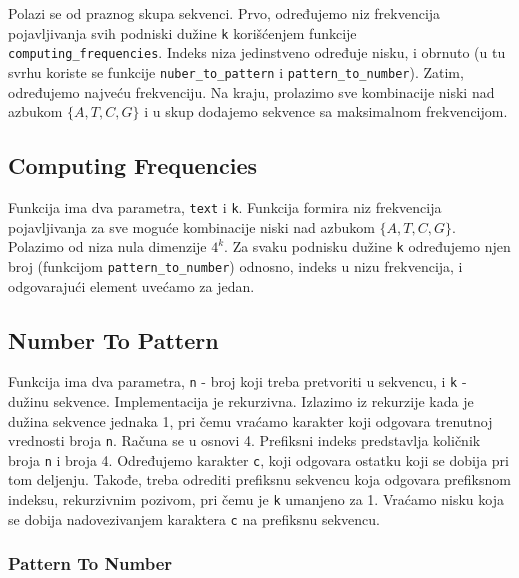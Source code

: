 Polazi se od praznog skupa sekvenci. Prvo, određujemo niz frekvencija pojavljivanja svih podniski dužine \texttt{k} korišćenjem funkcije \texttt{computing\_frequencies}. Indeks niza jedinstveno određuje nisku, i obrnuto (u tu svrhu koriste se funkcije \texttt{nuber\_to\_pattern} i \texttt{pattern\_to\_number}). Zatim, određujemo najveću frekvenciju. Na kraju, prolazimo sve kombinacije niski nad azbukom $\{A, T, C, G\}$ i u skup dodajemo sekvence sa maksimalnom frekvencijom.

 


\subsection{Computing Frequencies}

Funkcija ima dva parametra, \texttt{text} i \texttt{k}. Funkcija formira niz frekvencija pojavljivanja za sve moguće kombinacije niski nad azbukom $\{A, T, C, G\}$.
Polazimo od niza nula dimenzije $4^k$. Za svaku podnisku dužine \texttt{k} određujemo njen broj (funkcijom \texttt{pattern\_to\_number}) odnosno, indeks u nizu frekvencija, i odgovarajući element uvećamo za jedan.

 


\subsection{Number To Pattern}
\label{numberToPattern}

Funkcija ima dva parametra, \texttt{n} - broj koji treba pretvoriti u sekvencu, i \texttt{k} - dužinu sekvence. Implementacija je rekurzivna. Izlazimo iz rekurzije kada je dužina sekvence jednaka 1, pri čemu vraćamo karakter koji odgovara trenutnoj vrednosti broja \texttt{n}. Računa se u osnovi 4. Prefiksni indeks predstavlja količnik broja \texttt{n} i broja 4. Određujemo karakter \texttt{c}, koji odgovara ostatku koji se dobija pri tom deljenju. Takođe, treba odrediti prefiksnu sekvencu koja odgovara prefiksnom indeksu, rekurzivnim pozivom, pri čemu je \texttt{k} umanjeno za 1. Vraćamo nisku koja se dobija nadovezivanjem karaktera \texttt{c} na prefiksnu sekvencu.


 

\subsubsection{Pattern To Number}
\label{patternToNumber}

